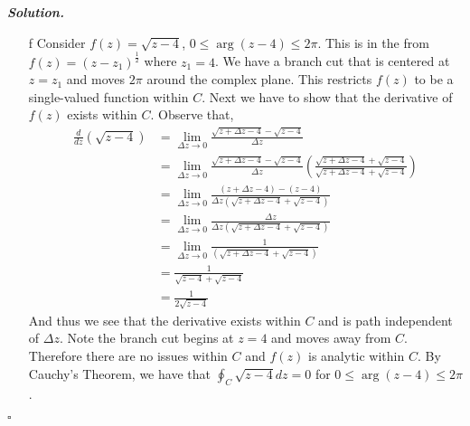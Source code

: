 \documentclass[12pt]{report}
\newenvironment{solution}[1][\it{Solution}]{\textbf{#1. } }{$\square$}
\begin{document}
\begin{solution}
\begin{enumerate}
        \item [f]
        Consider $f(z) = \sqrt{z-4}$, $0 \leq \arg(z-4) \le 2\pi$. This is in the from $f(z) = (z - z_1)^{\frac{1}{2}}$ where $z_1 = 4$. We have a branch cut that is centered at $z = z_1$ and moves $2\pi$ around the complex plane. This restricts $f(z)$ to be a single-valued function within $C$. Next we have to show that the derivative of $f(z)$ exists within $C$. Observe that,
        \begin{align*}
            \frac{d}{dz}\left( \sqrt{z - 4} \right) &= \lim_{\Delta z \rightarrow 0} \frac{\sqrt{z + \Delta z - 4} - \sqrt{z - 4}}{\Delta z}\\
            &= \lim_{\Delta z \rightarrow 0} \frac{\sqrt{z + \Delta z - 4} - \sqrt{z - 4}}{\Delta z} \left( \frac{\sqrt{z + \Delta z - 4} + \sqrt{z - 4}}{\sqrt{z + \Delta z - 4} + \sqrt{z - 4}} \right)\\
            &= \lim_{\Delta z \rightarrow 0} \frac{(z + \Delta z - 4) - (z - 4)}{\Delta z \left( \sqrt{z + \Delta z - 4} + \sqrt{z - 4} \right)}\\
            &= \lim_{\Delta z \rightarrow 0} \frac{\Delta z}{\Delta z \left( \sqrt{z + \Delta z - 4} + \sqrt{z - 4} \right)}\\
            &= \lim_{\Delta z \rightarrow 0} \frac{1}{\left( \sqrt{z + \Delta z - 4} + \sqrt{z - 4} \right)}\\
            &= \frac{1}{\sqrt{z - 4} + \sqrt{z - 4}}\\
            &= \frac{1}{2\sqrt{z - 4}}
        \end{align*}
        And thus we see that the derivative exists within $C$ and is path independent of $\Delta z$. Note the branch cut begins at $z = 4$ and moves away from $C$. Therefore there are no issues within $C$ and $f(z)$ is analytic within $C$. By Cauchy's Theorem, we have that $\boxed{\oint_C \sqrt{z-4} dz = 0}$ for $0 \leq \arg(z-4) \le 2\pi$. 
    \end{enumerate}
\end{solution}

\newpage


\end{document}
